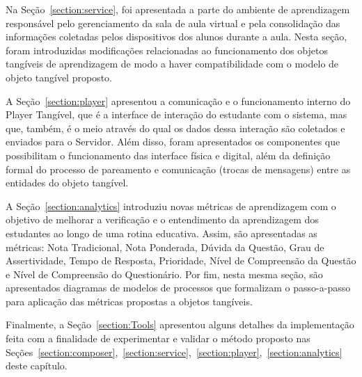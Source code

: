 Na Seção~\ref{section:service}, foi apresentada a parte do ambiente de aprendizagem responsável pelo gerenciamento da sala de aula virtual e pela consolidação das informações coletadas pelos dispositivos dos alunos durante a aula. Nesta seção, foram introduzidas modificações relacionadas ao funcionamento dos objetos tangíveis de aprendizagem de modo a haver compatibilidade com o modelo de objeto tangível proposto.

A Seção~\ref{section:player} apresentou a comunicação e o funcionamento interno do Player Tangível, que é a interface de interação do estudante com o sistema, mas que, também, é o meio através do qual os dados dessa interação são coletados e enviados para o Servidor. Além disso, foram apresentados os componentes que possibilitam o funcionamento das interface física e digital, além da definição formal do processo de pareamento e comunicação (trocas de mensagens) entre as entidades do objeto tangível.

A Seção~\ref{section:analytics} introduziu novas métricas de aprendizagem com o objetivo de melhorar a verificação e o entendimento da aprendizagem dos estudantes ao longo de uma rotina educativa. Assim, são apresentadas as métricas: Nota Tradicional, Nota Ponderada, Dúvida da Questão, Grau de Assertividade, Tempo de Resposta, Prioridade, Nível de Compreensão da Questão e Nível de Compreensão do Questionário. Por fim, nesta mesma seção, são apresentados diagramas de modelos de processos que formalizam o passo-a-passo para aplicação das métricas propostas a objetos tangíveis.


Finalmente, a Seção~\ref{section:Tools} apresentou alguns detalhes da implementação feita com a finalidade de experimentar e validar o método proposto nas Seções~\ref{section:composer},~\ref{section:service},~\ref{section:player},~\ref{section:analytics} deste capítulo.